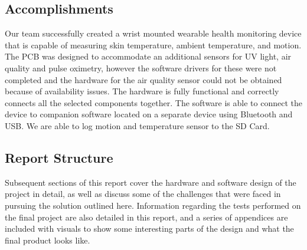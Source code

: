 \subsection{Accomplishments}

Our team successfully created a wrist mounted wearable health monitoring device
that is capable of measuring skin temperature, ambient temperature, and motion.
The PCB was designed to accommodate an additional sensors for UV light, air quality
and pulse oximetry, however the software drivers for these were not completed 
and the hardware for the air quality sensor could not be obtained because of 
availability issues. The hardware is fully functional and correctly
connects all the selected components together.  The software is able to connect
the device to companion software located on a separate device using Bluetooth
and USB.  We are able to log motion and temperature sensor to the SD Card.

\subsection{Report Structure}
Subsequent sections of this
report cover the hardware and software design of the project in detail, as well
as discuss some of the challenges that were faced in pursuing the solution
outlined here. Information regarding the tests performed on the final project
are also detailed in this report, and a series of appendices are included with
visuals to show some interesting parts of the design and what the final product
looks like.
